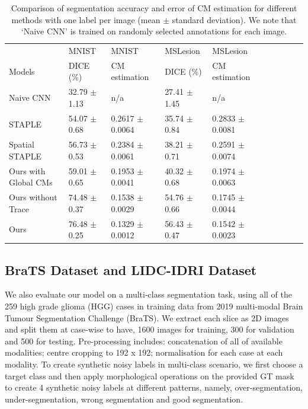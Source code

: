 \begin{table}[!h]
	\center
	\scriptsize
	\begin{tabular}{@{}llllllllll}
		\hline
		 & MNIST & MNIST  & MSLesion  & MSLesion  \\
		Models & DICE (\%) & CM estimation & DICE (\%) & CM estimation \\
		  
		\hline	
		Naive CNN & 32.79 $\pm$ 1.13 &  n/a & 27.41 $\pm$ 1.45 &  n/a  \\
		STAPLE \cite{warfield2004simultaneous}& 54.07 $\pm$ 0.68 &  0.2617 $\pm$ 0.0064& 35.74 $\pm$ 0.84 &  0.2833 $\pm$ 0.0081  \\ 
		Spatial STAPLE \cite{asman2012formulating} & 56.73 $\pm$ 0.53 &  0.2384 $\pm$ 0.0061& 38.21 $\pm$ 0.71 &  0.2591 $\pm$ 0.0074  \\
 		Ours with Global CMs  & 59.01 $\pm$ 0.65   & 0.1953 $\pm$ 0.0041   & 40.32 $\pm$ 0.68  & 0.1974 $\pm$ 0.0063    \\
		Ours without Trace & 74.48 $\pm$ 0.37  &  0.1538 $\pm$ 0.0029 & 54.76 $\pm$ 0.66 & 0.1745 $\pm$ 0.0044  \\
		Ours & 76.48 $\pm$ 0.25  &  0.1329 $\pm$ 0.0012 & 56.43 $\pm$ 0.47 &  0.1542 $\pm$ 0.0023  \\
		\hline
	\end{tabular}%
\caption{Comparison of segmentation accuracy and error of CM estimation for different methods with one label per image (mean $\pm$ standard deviation).  We note that `Naive CNN' is trained on randomly selected annotations for each image.}
\label{singlelabel of MNIST and MS}
\end{table}

\subsection{BraTS Dataset and LIDC-IDRI Dataset}
We also evaluate our model on a multi-class segmentation task, using all of the 259 high grade glioma (HGG) cases in training data from 2019 multi-modal Brain Tumour Segmentation Challenge (BraTS). We extract each slice as 2D images and split them at case-wise to have, 1600 images for training, 300 for validation and 500 for testing. Pre-processing includes: concatenation of all of available modalities; centre cropping to 192 x 192; normalisation for each case at each modality. To create synthetic noisy labels in multi-class scenario, we first choose a target class and then apply morphological operations on the provided GT mask to create 4 synthetic noisy labels at different patterns, namely, over-segmentation, under-segmentation, wrong segmentation and good segmentation.


